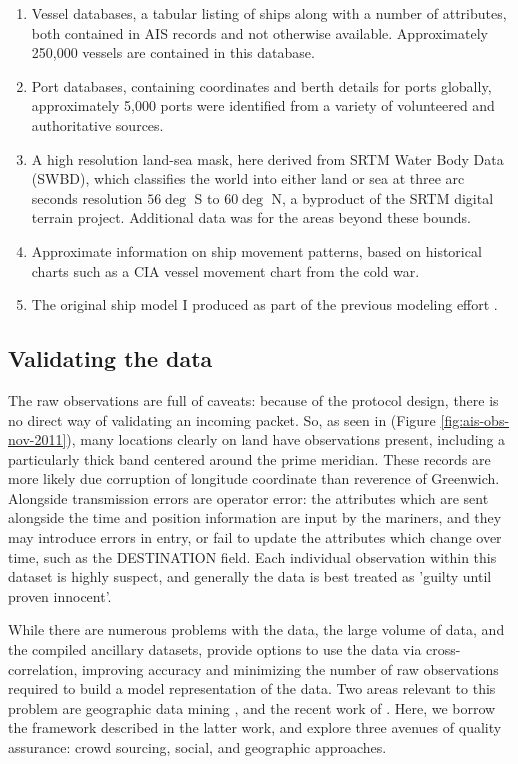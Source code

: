 \begin{enumerate}
  \item Vessel databases, a tabular listing of ships along with a number of attributes, both contained in AIS records and not otherwise available. Approximately 250,000 vessels are contained in this database.
  \item Port databases, containing coordinates and berth details for ports globally, approximately 5,000 ports were identified from a variety of volunteered and authoritative sources.
  \item A high resolution land-sea mask, here derived from SRTM Water Body Data (SWBD), which classifies the world into either land or sea at three arc seconds resolution $56\deg$ S to $60\deg$ N, a byproduct of the SRTM digital terrain project. Additional data was for the areas beyond these bounds.
  \item Approximate information on ship movement patterns, based on historical charts such as a CIA vessel movement chart from the cold war.
  \item The original ship model I produced as part of the previous modeling effort \citep{Halpern2008}.
\end{enumerate}

\subsection{Validating the data}

The raw observations are full of caveats: because of the protocol design, there is no direct way of validating an incoming packet. So, as seen in (Figure \ref{fig:ais-obs-nov-2011}), many locations clearly on land have observations present, including a particularly thick band centered around the prime meridian. These records are more likely due corruption of longitude coordinate than reverence of Greenwich. Alongside transmission errors are operator error: the attributes which are sent alongside the time and position information are input by the mariners, and they may introduce errors in entry, or fail to update the attributes which change over time, such as the DESTINATION field. Each individual observation within this dataset is highly suspect, and generally the data is best treated as 'guilty until proven innocent'.

While there are numerous problems with the data, the large volume of data, and the compiled ancillary datasets, provide options to use the data via cross-correlation, improving accuracy and minimizing the number of raw observations required to build a model representation of the data. Two areas relevant to this problem are geographic data mining \citep{miller2009geographic}, and the recent work of \citep{goodchildli2012}. Here, we borrow the framework described in the latter work, and explore three avenues of quality assurance: crowd sourcing, social, and geographic approaches.

